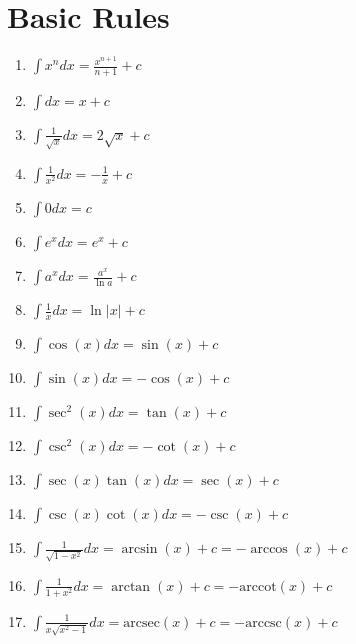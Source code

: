 \section{Basic Rules}
  \begin{enumerate}
    \item $\int x^n dx = \frac{x^{n+1}}{n+1} + c$
    \item $\int dx = x + c$
    \item $\int \frac{1}{\sqrt{x}} dx = 2\sqrt{x} + c$
    \item $\int \frac{1}{x^2} dx = -\frac{1}{x} + c$
    \item $\int 0 dx = c$ 
    \item $\int e^x dx = e^x + c$
    \item $\int a^x dx = \frac{a^x}{\ln a} + c$
    \item $\int \frac{1}{x} dx = \ln |x| + c$
    \item $\int \cos(x) dx = \sin(x) + c$
    \item $\int \sin(x) dx = -\cos(x) + c$
    \item $\int \sec^2(x) dx = \tan(x) + c$
    \item $\int \csc^2(x) dx = -\cot(x) + c$
    \item $\int \sec(x)\tan(x) dx = \sec(x) + c$
    \item $\int \csc(x)\cot(x) dx = -\csc(x) + c$
    \item $\int \frac{1}{\sqrt{1-x^2}} dx = \arcsin(x) + c = -\arccos(x) + c$
    \item $\int \frac{1}{1+x^2} dx = \arctan(x) + c = -\text{arccot}(x) + c$
    \item $\int \frac{1}{x\sqrt{x^2-1}} dx = \text{arcsec}(x) + c = -\text{arccsc}(x) + c$
  \end{enumerate}
